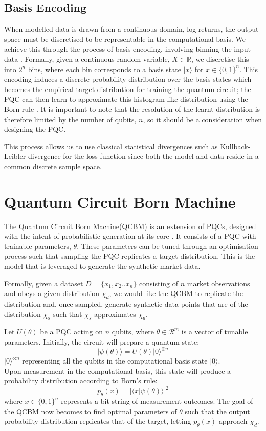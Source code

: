 \documentclass[12pt]{article}
\newcommand{\newp}
    {
    \vskip 0.5cm 
  }
\numberwithin{equation}{section}
\begin{document}
\subsection{Basis Encoding}
When modelled data is drawn from a continuous domain, log returns, the output 
space must be discretised to be representable in the computational basis. We 
achieve this through the process of basis encoding, involving binning the 
input data \autocite{li_2024_comparing}. Formally, given a continuous random variable, $X \in \mathbb{R}$, 
we discretise this into $2^n$ bins, where each bin corresponds to a 
basis state $|x\rangle$ for $x \in \{0,1\}^n$.
This encoding induces a discrete probability distribution over the basis states 
which becomes the empirical target distribution for training the quantum circuit;
 the PQC can then learn to approximate this histogram-like distribution using the 
Born rule \autocite{stoica_2022_born}.
It is important to note that the resolution of the learnt distribution is therefore 
limited by the number of qubits, $n$, so it should be a consideration when designing 
the PQC. 
\newp 
This process allows us to use classical statistical divergences such as Kullback-Leibler 
divergence for the loss function since both the model and data reside in a common 
discrete sample space. 
\newpage
\section{Quantum Circuit Born Machine}
The Quantum Circuit Born Machine(QCBM) is an extension of PQCs, designed with the 
intent of probabilistic generation at its core \autocite{gili_2022_do, samuel_2025_introduction}. It consists of a PQC with trainable 
parameters, $\theta$. These parameters can be tuned through an optimisation process 
such that sampling the PQC replicates a target distribution\autocite{ganguly_2025_hybrid}. This is the model that 
is leveraged to generate the synthetic market data.
\newp
Formally, given a dataset $D = \{x_1, x_2.. x_n\}$ consisting of $n$ market observations and 
obeys a given distribution $\chi_d$, we would like the QCBM to replicate the distribution 
and, once sampled, generate synthetic data points that are of the distribution $\chi_s$ 
such that $\chi_s$ approximates $\chi_d$.
\newp
Let $U(\theta)$ be a PQC acting on $n$ qubits, where $\theta \in \mathcal{R}^m$ 
is a vector of tunable parameters. Initially, the circuit will prepare a quantum 
state:
\begin{equation}
|\psi(\theta)\rangle = U(\theta)|0\rangle^{\otimes n}
\end{equation}
$|0\rangle^{\otimes n}$ representing all the qubits in the computational basis
state $|0\rangle$.\\
Upon measurement in the computational basis, this state will produce a probability 
distribution according to Born's rule: 
\begin{equation}
p_{\theta}(x) = |\langle x|\psi(\theta)\rangle|^2
\end{equation}
where $x\in\{0,1\}^n$ represents a bit string of measurement outcomes. The goal 
of the QCBM now becomes to find optimal parameters of $\theta$ such that the 
output probability distribution replicates that of the target, letting $p_{\theta}
(x)$ approach $\chi_d$.
\end{document}
